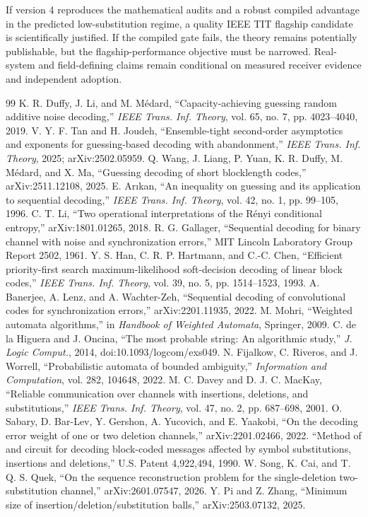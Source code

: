 \documentclass[11pt]{article}
\theoremstyle{definition}
\theoremstyle{remark}
\begin{document}
If version 4 reproduces the mathematical audits and a robust compiled advantage in the predicted low-substitution regime, a quality IEEE TIT flagship candidate is scientifically justified.  If the compiled gate fails, the theory remains potentially publishable, but the flagship-performance objective must be narrowed.  Real-system and field-defining claims remain conditional on measured receiver evidence and independent adoption.

\begin{thebibliography}{99}
 K. R. Duffy, J. Li, and M. M\'edard, ``Capacity-achieving guessing random additive noise decoding,'' \emph{IEEE Trans. Inf. Theory}, vol. 65, no. 7, pp. 4023--4040, 2019.
 V. Y. F. Tan and H. Joudeh, ``Ensemble-tight second-order asymptotics and exponents for guessing-based decoding with abandonment,'' \emph{IEEE Trans. Inf. Theory}, 2025; arXiv:2502.05959.
 Q. Wang, J. Liang, P. Yuan, K. R. Duffy, M. M\'edard, and X. Ma, ``Guessing decoding of short blocklength codes,'' arXiv:2511.12108, 2025.
 E. Ar\i kan, ``An inequality on guessing and its application to sequential decoding,'' \emph{IEEE Trans. Inf. Theory}, vol. 42, no. 1, pp. 99--105, 1996.
 C. T. Li, ``Two operational interpretations of the R\'enyi conditional entropy,'' arXiv:1801.01265, 2018.
 R. G. Gallager, ``Sequential decoding for binary channel with noise and synchronization errors,'' MIT Lincoln Laboratory Group Report 2502, 1961.
 Y. S. Han, C. R. P. Hartmann, and C.-C. Chen, ``Efficient priority-first search maximum-likelihood soft-decision decoding of linear block codes,'' \emph{IEEE Trans. Inf. Theory}, vol. 39, no. 5, pp. 1514--1523, 1993.
 A. Banerjee, A. Lenz, and A. Wachter-Zeh, ``Sequential decoding of convolutional codes for synchronization errors,'' arXiv:2201.11935, 2022.
 M. Mohri, ``Weighted automata algorithms,'' in \emph{Handbook of Weighted Automata}, Springer, 2009.
 C. de la Higuera and J. Oncina, ``The most probable string: An algorithmic study,'' \emph{J. Logic Comput.}, 2014, doi:10.1093/logcom/exs049.
 N. Fijalkow, C. Riveros, and J. Worrell, ``Probabilistic automata of bounded ambiguity,'' \emph{Information and Computation}, vol. 282, 104648, 2022.
 M. C. Davey and D. J. C. MacKay, ``Reliable communication over channels with insertions, deletions, and substitutions,'' \emph{IEEE Trans. Inf. Theory}, vol. 47, no. 2, pp. 687--698, 2001.
 O. Sabary, D. Bar-Lev, Y. Gershon, A. Yucovich, and E. Yaakobi, ``On the decoding error weight of one or two deletion channels,'' arXiv:2201.02466, 2022.
 ``Method of and circuit for decoding block-coded messages affected by symbol substitutions, insertions and deletions,'' U.S. Patent 4,922,494, 1990.
 W. Song, K. Cai, and T. Q. S. Quek, ``On the sequence reconstruction problem for the single-deletion two-substitution channel,'' arXiv:2601.07547, 2026.
 Y. Pi and Z. Zhang, ``Minimum size of insertion/deletion/substitution balls,'' arXiv:2503.07132, 2025.
\end{thebibliography}
\end{document}
